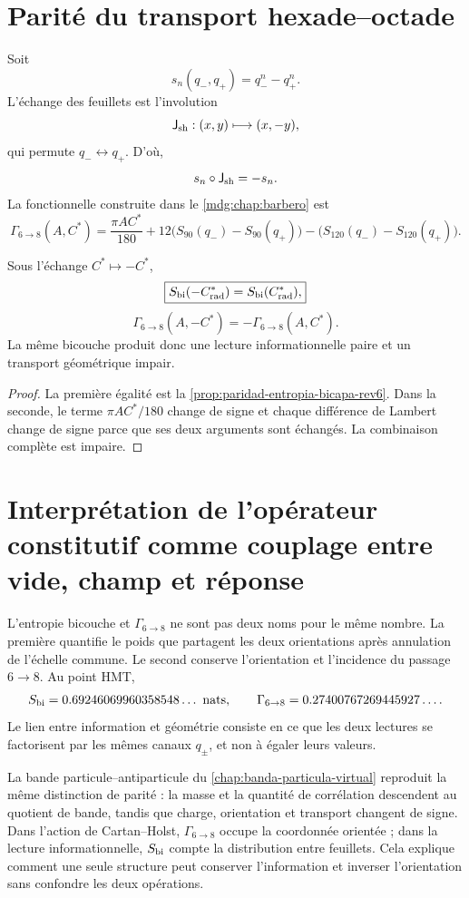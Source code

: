 \section{Parité du transport hexade--octade}

Soit
\[
 s_n(q_-,q_+)=q_-^n-q_+^n.
\]
L'échange des feuillets est l'involution
\[
 \mathsf J_{\rm sh}:(x,y)\longmapsto(x,-y),
\]
qui permute \(q_-\leftrightarrow q_+\). D'où,
\[
 s_n\circ\mathsf J_{\rm sh}=-s_n.
\]
La fonctionnelle construite dans le \cref{mdg:chap:barbero} est
\[
 \Gamma_{6\to8}(A,C^*)
 =
 \frac{\pi A C^*}{180}
{}+12\bigl(S_{90}(q_-)-S_{90}(q_+)\bigr)
-\bigl(S_{120}(q_-)-S_{120}(q_+)\bigr).
\]

\begin{theorem}
\label{thm:paridad-bicapa-barbero-rev6}
Sous l'échange \(C^*\mapsto-C^*\),
\[
 \boxed{S_{\rm bi}(-C^*_{\rm rad})
        =S_{\rm bi}(C^*_{\rm rad}),}
\]
\[
 \boxed{\Gamma_{6\to8}(A,-C^*)
        =-\Gamma_{6\to8}(A,C^*).}
\]
La même bicouche produit donc une lecture informationnelle paire et un
transport géométrique impair.
\end{theorem}

\begin{proof}
La première égalité est la
\cref{prop:paridad-entropia-bicapa-rev6}. Dans la seconde, le terme
\(\pi AC^*/180\) change de signe et chaque différence de Lambert change de
signe parce que ses deux arguments sont échangés. La combinaison complète est
impaire.
\end{proof}

\section{Interprétation de l'opérateur constitutif comme couplage entre vide, champ et réponse}

L'entropie bicouche et \(\Gamma_{6\to8}\) ne sont pas deux noms pour le même
nombre. La première quantifie le poids que partagent les deux orientations
après annulation de l'échelle commune. Le second conserve l'orientation et
l'incidence du passage \(6\to8\). Au point HMT,
\[
 S_{\rm bi}
 =0.69246069960358548\ldots\ {\rm nats},
 \qquad
 \Gamma_{6\to8}
 =0.27400767269445927\ldots.
\]
Le lien entre information et géométrie consiste en ce que les deux lectures
se factorisent par les mêmes canaux \(q_\pm\), et non à égaler leurs valeurs.

La bande particule--antiparticule du
\cref{chap:banda-particula-virtual} reproduit la même distinction de
parité : la masse et la quantité de corrélation descendent au quotient de
bande, tandis que charge, orientation et transport changent de signe. Dans
l'action de Cartan--Holst, \(\Gamma_{6\to8}\) occupe la coordonnée orientée ;
dans la lecture informationnelle, \(S_{\rm bi}\) compte la distribution entre
feuillets. Cela explique comment une seule structure peut conserver
l'information et inverser l'orientation sans confondre les deux opérations.
